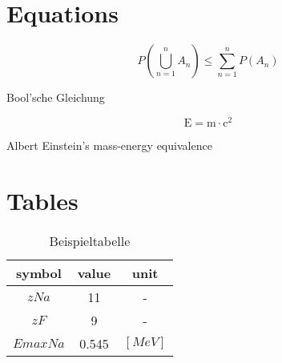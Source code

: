 












\section{Equations}\label{sec:equations}

\begin{mycapequ}[!htbp]
    \begin{equation}
        {P(\bigcup_{n=1}^n A_n) \leq \sum_{n=1}^n P(A_n)}
        \label{eq:bool1} %
    \end{equation}
    \caption{Bool'sche Gleichung}
\end{mycapequ}

\begin{mycapequ}[!htbp]
    \begin{equation}
        \mathrm{E=m\cdot c^2}
        \label{eq:meequi} %
    \end{equation}
    \caption{Albert Einstein's mass-energy equivalence}
\end{mycapequ}

\clearpage

\section{Tables}\label{sec:tables}

\begin{table}[!htbp]
\centering
    \begin{tabular}{ | c | c | c | }
        \hline
        symbol & value & unit \\ \hline            
        $z Na$ & 11 & - \\ \hline      
        $z F$ & 9 & - \\ \hline      
        $Emax Na$ & 0.545 & $[MeV]$ \\ \hline
    \end{tabular}
    \caption{Beispieltabelle}
    \label{tab:example} %
\end{table}

